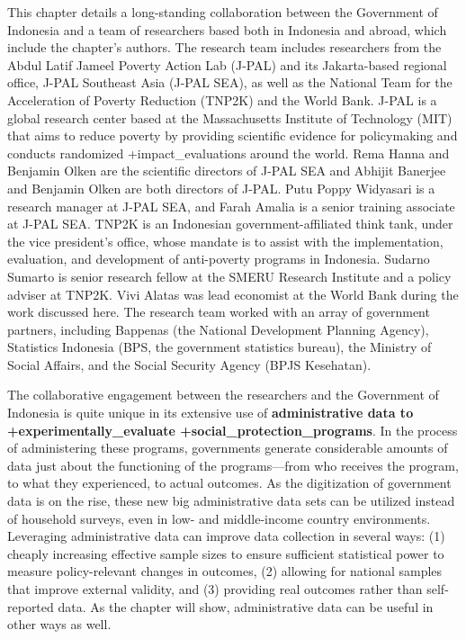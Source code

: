 \documentclass[
]{WileySix}
\begin{document}
This chapter details a long-standing collaboration between the Government of Indonesia and a team of researchers based both in Indonesia and abroad, which include the chapter's authors. The research team includes researchers from the Abdul Latif Jameel Poverty Action Lab (J-PAL) and its Jakarta-based regional office, J-PAL Southeast Asia (J-PAL SEA), as well as the National Team for the Acceleration of Poverty Reduction (TNP2K) and the World Bank. J-PAL is a global research center based at the Massachusetts Institute of Technology (MIT) that aims to reduce poverty by providing scientific evidence for policymaking and conducts randomized +impact\_evaluations\textbar{} around the world. Rema Hanna and Benjamin Olken are the scientific directors of J-PAL SEA and Abhijit Banerjee and Benjamin Olken are both directors of J-PAL. Putu Poppy Widyasari is a research manager at J-PAL SEA, and Farah Amalia is a senior training associate at J-PAL SEA. TNP2K is an Indonesian government-affiliated think tank, under the vice president's office, whose mandate is to assist with the implementation, evaluation, and development of anti-poverty programs in Indonesia. Sudarno Sumarto is senior research fellow at the SMERU Research Institute and a policy adviser at TNP2K. Vivi Alatas was lead economist at the World Bank during the work discussed here. The research team worked with an array of government partners, including Bappenas (the National Development Planning Agency), Statistics Indonesia (BPS, the government statistics bureau), the Ministry of Social Affairs, and the Social Security Agency (BPJS Kesehatan).

The collaborative engagement between the researchers and the Government of Indonesia is quite unique in its extensive use of \textbf{administrative data to +experimentally\_evaluate\textbar{} +social\_protection\_programs\textbar{}}. In the process of administering these programs, governments generate considerable amounts of data just about the functioning of the programs---from who receives the program, to what they experienced, to actual outcomes. As the digitization of government data is on the rise, these new big administrative data sets can be utilized instead of household surveys, even in low- and middle-income country environments. Leveraging administrative data can improve data collection in several ways: (1) cheaply increasing effective sample sizes to ensure sufficient statistical power to measure policy-relevant changes in outcomes, (2) allowing for national samples that improve external validity, and (3) providing real outcomes rather than self-reported data. As the chapter will show, administrative data can be useful in other ways as well.
\end{document}
